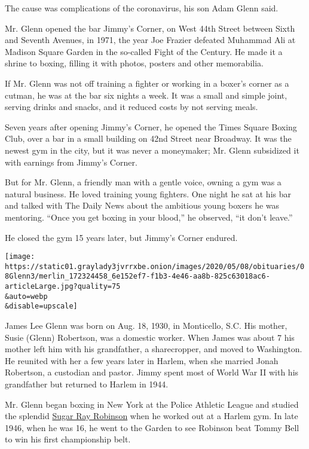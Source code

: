 The cause was complications of the coronavirus, his son Adam Glenn said.

Mr. Glenn opened the bar Jimmy's Corner, on West 44th Street between
Sixth and Seventh Avenues, in 1971, the year Joe Frazier defeated
Muhammad Ali at Madison Square Garden in the so-called Fight of the
Century. He made it a shrine to boxing, filling it with photos, posters
and other memorabilia.

If Mr. Glenn was not off training a fighter or working in a boxer's
corner as a cutman, he was at the bar six nights a week. It was a small
and simple joint, serving drinks and snacks, and it reduced costs by not
serving meals.

Seven years after opening Jimmy's Corner, he opened the Times Square
Boxing Club, over a bar in a small building on 42nd Street near
Broadway. It was the newest gym in the city, but it was never a
moneymaker; Mr. Glenn subsidized it with earnings from Jimmy's Corner.

But for Mr. Glenn, a friendly man with a gentle voice, owning a gym was
a natural business. He loved training young fighters. One night he sat
at his bar and talked with The Daily News about the ambitious young
boxers he was mentoring. ``Once you get boxing in your blood,'' he
observed, ``it don't leave.''

He closed the gym 15 years later, but Jimmy's Corner endured.

\texttt{[image: https://static01.graylady3jvrrxbe.onion/images/2020/05/08/obituaries/08Glenn3/merlin\_172324458\_6e152ef7-f1b3-4e46-aa8b-825c63018ac6-articleLarge.jpg?quality=75\\\&auto=webp\\\&disable=upscale]}

James Lee Glenn was born on Aug. 18, 1930, in Monticello, S.C. His
mother, Susie (Glenn) Robertson, was a domestic worker. When James was
about 7 his mother left him with his grandfather, a sharecropper, and
moved to Washington. He reunited with her a few years later in Harlem,
when she married Jonah Robertson, a custodian and pastor. Jimmy spent
most of World War II with his grandfather but returned to Harlem in
1944.

Mr. Glenn began boxing in New York at the Police Athletic League and
studied the splendid
\href{https://www.nytimes3xbfgragh.onion/1989/04/13/obituaries/sugar-ray-robinson-boxing-s-best-is-dead.html}{Sugar
Ray Robinson} when he worked out at a Harlem gym. In late 1946, when he
was 16, he went to the Garden to see Robinson beat Tommy Bell to win his
first championship belt.

